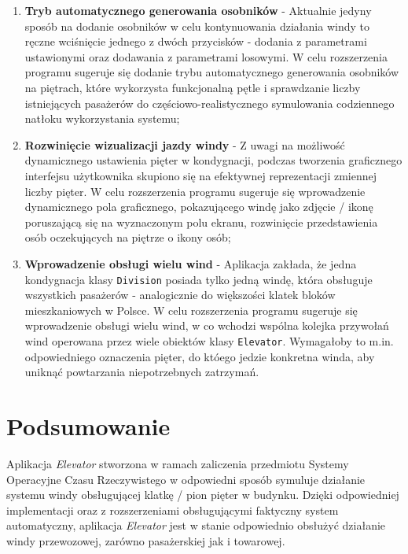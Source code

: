 \documentclass[12pt, a4paper]{article}
\begin{document}
\begin{enumerate}
  \item \textbf{Tryb automatycznego generowania osobników} - Aktualnie jedyny sposób na dodanie osobników w celu kontynuowania działania windy to ręczne wciśnięcie 
          jednego z dwóch przycisków - dodania z parametrami ustawionymi oraz dodawania z parametrami losowymi. W celu rozszerzenia programu sugeruje się dodanie 
          trybu automatycznego generowania osobników na piętrach, które wykorzysta funkcjonalną pętle i sprawdzanie liczby istniejących pasażerów do 
          częściowo-realistycznego symulowania codziennego natłoku wykorzystania systemu;
  \item \textbf{Rozwinięcie wizualizacji jazdy windy} - Z uwagi na możliwość dynamicznego ustawienia pięter w kondygnacji, podczas tworzenia graficznego interfejsu użytkownika
        skupiono się na efektywnej reprezentacji zmiennej liczby pięter. W celu rozszerzenia programu sugeruje się wprowadzenie dynamicznego pola graficznego, pokazującego 
        windę jako zdjęcie / ikonę poruszającą się na wyznaczonym polu ekranu, rozwinięcie przedstawienia osób oczekujących na piętrze o ikony osób; 
  \item \textbf{Wprowadzenie obsługi wielu wind} - Aplikacja zakłada, że jedna kondygnacja klasy \texttt{Division} posiada tylko jedną windę, która obsługuje wszystkich 
        pasażerów - analogicznie do większości klatek bloków mieszkaniowych w Polsce. W celu rozszerzenia programu sugeruje się wprowadzenie obsługi wielu wind, w co wchodzi 
        wspólna kolejka przywołań wind operowana przez wiele obiektów klasy \texttt{Elevator}. Wymagałoby to m.in. odpowiedniego oznaczenia pięter, do któego jedzie konkretna
        winda, aby uniknąć powtarzania niepotrzebnych zatrzymań. 
\end{enumerate}

\newpage

\section{Podsumowanie}
\label{sec:podsumowanie}

Aplikacja \emph{Elevator} stworzona w ramach zaliczenia przedmiotu Systemy Operacyjne Czasu Rzeczywistego w odpowiedni sposób symuluje działanie systemu windy obsługującej 
klatkę / pion pięter w budynku. Dzięki odpowiedniej implementacji oraz z rozszerzeniami obsługującymi faktyczny system automatyczny, aplikacja \emph{Elevator} jest 
w stanie odpowiednio obsłużyć działanie windy przewozowej, zarówno pasażerskiej jak i towarowej.
\end{document}
